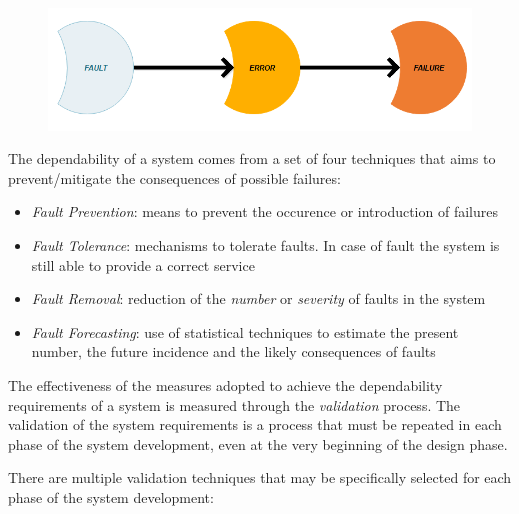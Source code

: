 \begin{figure}[h!]
	\includegraphics[width=\textwidth]{img/fault-error-failure.png}
	\caption{}
\end{figure}

The dependability of a system comes from a set of four techniques that aims to prevent/mitigate the consequences of possible failures:

\begin{itemize}
	\item \textsl{Fault Prevention}: means to prevent the occurence or introduction of failures
	\item \textsl{Fault Tolerance}: mechanisms to tolerate faults. In case of fault the system is still able to provide a correct service
	\item \textsl{Fault Removal}: reduction of the \textsl{number} or \textsl{severity} of faults in the system
	\item \textsl{Fault Forecasting}: use of statistical techniques to estimate the present number, the future incidence and the likely consequences of faults
\end{itemize}

The effectiveness of the measures adopted to achieve the dependability requirements of a system is measured through the \textsl{validation} process.
The validation of the system requirements is a process that must be repeated in each phase of the system development, even at the very beginning of the design phase.

There are multiple validation techniques that may be specifically selected for each phase of the system development:

